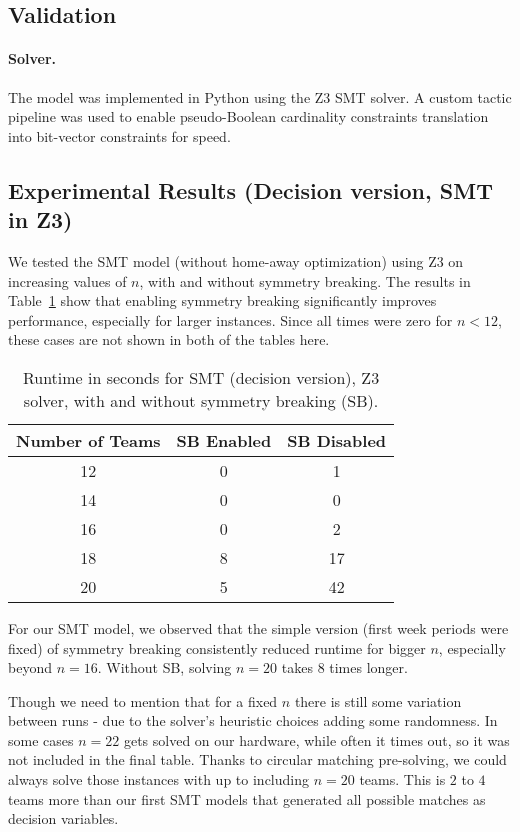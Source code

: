 \subsection{Validation}

\paragraph{Solver.}
The model was implemented in Python using the Z3 SMT solver. A custom tactic pipeline was used to enable pseudo-Boolean cardinality constraints translation into bit-vector constraints for speed.

\subsection*{Experimental Results (Decision version, SMT in Z3)}

We tested the SMT model (without home-away optimization) using Z3 on increasing values of $n$, with and without symmetry breaking. The results in Table~\ref{tab:smt-results} show that enabling symmetry breaking significantly improves performance, especially for larger instances.
Since all times were zero for $n < 12$, these cases are not shown in both of the tables here.

\begin{table}[h!]
\centering
\caption{Runtime in seconds for SMT (decision version), Z3 solver, with and without symmetry breaking (SB).}
\label{tab:smt-results}
\begin{tabular}{|c|c|c|}
\hline
\textbf{Number of Teams} & \textbf{SB Enabled} & \textbf{SB Disabled} \\
\hline
12 & 0 & 1 \\
14 & 0 & 0 \\
16 & 0 & 2 \\
18 & 8 & 17 \\
20 & 5 & 42 \\
\hline
\end{tabular}
\end{table}
For our SMT model, we observed that the simple version (first week periods were fixed) of symmetry breaking consistently reduced runtime for bigger $n$, especially beyond $n = 16$. Without SB, solving $n=20$ takes $8$ times longer.

Though we need to mention that for a fixed $n$ there is still some variation between runs - due to the solver's heuristic choices adding some randomness. In some cases $n = 22$ gets solved on our hardware, while often it times out, so it was not included in the final table.
Thanks to circular matching pre-solving, we could always solve those instances with up to including $n=20$ teams. This is $2$ to $4$ teams more than our first SMT models that generated all possible matches as decision variables.

